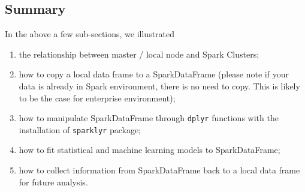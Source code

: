 \documentclass[]{book}
\newenvironment{Shaded}{\begin{snugshade}}{\end{snugshade}}
\newcommand{\KeywordTok}[1]{\textcolor[rgb]{0.13,0.29,0.53}{\textbf{{#1}}}}
\newcommand{\DataTypeTok}[1]{\textcolor[rgb]{0.13,0.29,0.53}{{#1}}}
\newcommand{\DecValTok}[1]{\textcolor[rgb]{0.00,0.00,0.81}{{#1}}}
\newcommand{\FloatTok}[1]{\textcolor[rgb]{0.00,0.00,0.81}{{#1}}}
\newcommand{\StringTok}[1]{\textcolor[rgb]{0.31,0.60,0.02}{{#1}}}
\newcommand{\NormalTok}[1]{{#1}}
\theoremstyle{definition}
\theoremstyle{definition}
\theoremstyle{remark}
\begin{document}
\begin{Shaded}
\end{Shaded}

\subsection{Summary}\label{summary}

In the above a few sub-sections, we illustrated

\begin{enumerate}
\def\labelenumi{(\arabic{enumi})}
\item
  the relationship between master / local node and Spark Clusters;
\item
  how to copy a local data frame to a SparkDataFrame (please note if
  your data is already in Spark environment, there is no need to copy.
  This is likely to be the case for enterprise environment);
\item
  how to manipulate SparkDataFrame through \texttt{dplyr} functions with
  the installation of \texttt{sparklyr} package;
\item
  how to fit statistical and machine learning models to SparkDataFrame;
\item
  how to collect information from SparkDataFrame back to a local data
  frame for future analysis.
\end{enumerate}
\end{document}
